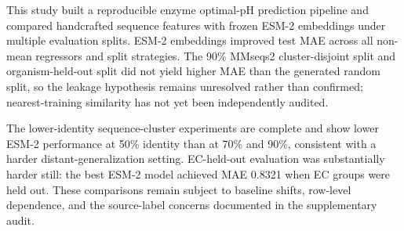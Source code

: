 This study built a reproducible enzyme optimal-pH prediction pipeline and compared handcrafted sequence features with frozen ESM-2 embeddings under multiple evaluation splits. ESM-2 embeddings improved test MAE across all non-mean regressors and split strategies. The 90\% MMseqs2 cluster-disjoint split and organism-held-out split did not yield higher MAE than the generated random split, so the leakage hypothesis remains unresolved rather than confirmed; nearest-training similarity has not yet been independently audited.

The lower-identity sequence-cluster experiments are complete and show lower ESM-2 performance at 50\% identity than at 70\% and 90\%, consistent with a harder distant-generalization setting. EC-held-out evaluation was substantially harder still: the best ESM-2 model achieved MAE 0.8321 when EC groups were held out. These comparisons remain subject to baseline shifts, row-level dependence, and the source-label concerns documented in the supplementary audit.
